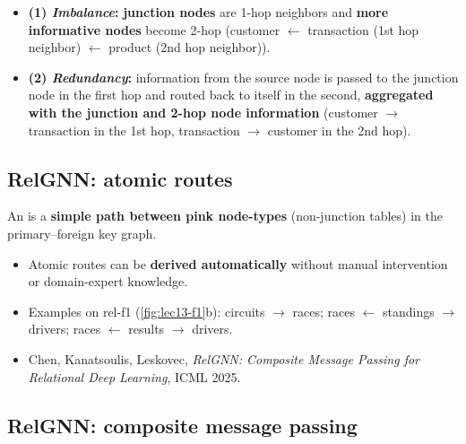 \begin{itemize}
  \item \textbf{(1) \emph{Imbalance}:} \textbf{junction nodes} are 1-hop neighbors and
    \textbf{more informative nodes} become 2-hop (customer $\leftarrow$ transaction (1st
    hop neighbor) $\leftarrow$ product (2nd hop neighbor)).
  \item \textbf{(2) \emph{Redundancy}:} information from the source node is passed to the
    junction node in the first hop and routed back to itself in the second,
    \textbf{aggregated with the junction and 2-hop node information} (customer $\to$
    transaction in the 1st hop, transaction $\to$ customer in the 2nd hop).
\end{itemize}

\subsection{RelGNN: atomic routes}\label{sec:lec13-atomic}

\begin{definition}\label{def:lec13-atomic}
  An  is a \textbf{simple path between pink node-types} (non-junction
  tables) in the primary--foreign key graph.
\end{definition}
\begin{itemize}
  \item Atomic routes can be \textbf{derived automatically} without manual intervention
    or domain-expert knowledge.
  \item Examples on rel-f1 (\cref{fig:lec13-f1}b): circuits $\to$ races; races
    $\leftarrow$ standings $\to$ drivers; races $\leftarrow$ results $\to$ drivers.
  \item Chen, Kanatsoulis, Leskovec, \emph{RelGNN: Composite Message Passing for
    Relational Deep Learning}, ICML 2025.
\end{itemize}

\subsection{RelGNN: composite message passing}\label{sec:lec13-cmp}

